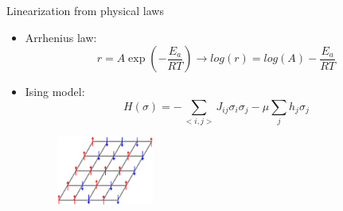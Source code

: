\documentclass[aspectratio=169]{beamer}
\begin{document}
\begin{frame}{Linearization from physical laws}
    \begin{itemize}
        \item Arrhenius law:
        \begin{equation*}
            r = A \exp(-\frac{E_a}{RT}) \longrightarrow log(r) = log(A) - \frac{E_a}{RT}
        \end{equation*}
        \item Ising model:
        \begin{equation*}
            H(\sigma) = - \sum_{<i, j>} J_{ij}\sigma_i \sigma_j - \mu \sum_j h_j \sigma_j
        \end{equation*}
        \begin{figure}
            \centering
            \includegraphics[width=0.3\textwidth]{figures/ising.png}
        \end{figure}
    \end{itemize}
\end{frame}
\end{document}
